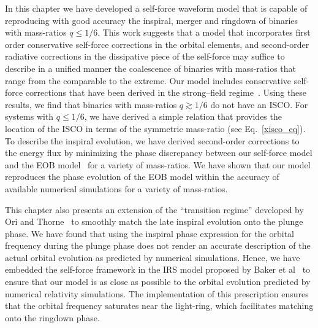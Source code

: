 In this chapter we have developed a self-force waveform model that is capable of reproducing with good accuracy the inspiral, merger and ringdown of binaries with mass-ratios \(q\leq 1/6\). This work suggests that a model that incorporates first order conservative self-force corrections in the orbital elements, and second-order radiative corrections in the dissipative piece of the self-force may suffice to describe in a unified manner the coalescence of binaries with mass-ratios that range from the comparable to the extreme. Our model includes conservative self-force corrections that have been derived in the strong--field regime~\cite{Akcay:2012}. Using these results, we find that binaries with mass-ratios \(q\gtrsim1/6\) do not have an ISCO. For systems with \(q\leq1/6\), we have derived a simple relation that provides the location of the ISCO in terms of the symmetric mass-ratio (see Eq.~\eqref{xisco_eq}). To describe the inspiral evolution, we have derived second-order corrections to the energy flux by 
minimizing the phase discrepancy between our self-force model and the EOB model~\cite{BuonannoEOBv2Main, Damour:2013} for a variety of mass-ratios. We have shown that our model reproduces the phase evolution of the EOB model within the accuracy of available numerical simulations for a variety of mass-ratios. 

This chapter also presents an extension of the ``transition regime'' developed by Ori and Thorne~\cite{amos} to smoothly match the late inspiral evolution onto the plunge phase. We have found that using the inspiral phase expression for the orbital frequency during the plunge phase does not render an accurate description of the actual orbital evolution as predicted by numerical simulations. Hence, we have embedded the self-force framework in the IRS model proposed by Baker et al~\cite{Baker:2008} to ensure that our model is as close as possible to the orbital evolution predicted by numerical relativity simulations. The implementation of this  prescription ensures that the orbital frequency saturates near the light-ring, which facilitates matching onto the ringdown phase. 

